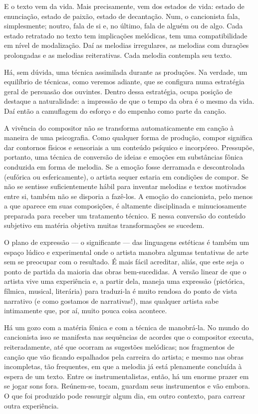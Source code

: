 E o texto vem da vida. Mais precisamente, vem dos estados de vida:
estado de enunciação, estado de paixão, estado de decantação. Num, o
cancionista fala, simplesmente; noutro, fala de si e, no último, fala de
alguém ou de algo. Cada estado retratado no texto tem implicações
melódicas, tem uma compatibilidade em nível de modalização. Daí as
melodias irregulares, as melodias com durações prolongadas e as melodias
reiterativas. Cada melodia contempla seu texto.

Há, sem dúvida, uma técnica assimilada durante as produções. Na verdade,
um equilíbrio de técnicas, como veremos adiante, que se configura numa
estratégia geral de persuasão dos ouvintes. Dentro dessa estratégia,
ocupa posição de destaque a naturalidade: a impressão de que o tempo da
obra é o mesmo da vida. Daí então a camuflagem do esforço e do empenho
como parte da canção.

A vivência do compositor não se transforma automaticamente em canção à
maneira de uma psicografia. Como qualquer forma de produção, compor
significa dar contornos físicos e sensoriais a um conteúdo psíquico e
incorpóreo. Pressupõe, portanto, uma técnica de conversão de ideias e
emoções em substâncias fônica conduzida em forma de melodia. Se a emoção
fosse derramada e descontrolada (eufórica ou esfericamente), o artista
sequer estaria em condições de compor. Se não se sentisse
suficientemente hábil para inventar melodias e textos motivados entre
si, também não se disporia a fazê-los. A emoção do cancionista, pelo
menos a que aparece em suas composições, é altamente disciplinada e
minuciosamente preparada para receber um tratamento técnico. E nessa
conversão do conteúdo subjetivo em matéria objetiva muitas
transformações se sucedem.

O plano de expressão --- o significante --- das linguagens estéticas é também
um espaço lúdico e experimental onde o artista manobra algumas
tentativas de arte sem se preocupar com o resultado. É mais fácil
acreditar, aliás, que este seja o ponto de partida da maioria das obras
bem-sucedidas. A versão linear de que o artista vive uma experiência e,
a partir dela, maneja uma expressão (pictórica, fílmica, musical,
literária) para traduzi-la é muito rendosa do ponto de vista narrativo
(e como gostamos de narrativas!), mas qualquer artista sabe intimamente
que, por aí, muito pouca coisa acontece.

Há um gozo com a matéria fônica e com a técnica de manobrá-la. No mundo
do cancionista isso se manifesta nas sequências de acordes que o
compositor executa, reiteradamente, até que ocorram as sugestões
melódicas; nos fragmentos de canção que vão ficando espalhados pela
carreira do artista; e mesmo nas obras incompletas, tão frequentes, em
que a melodia já está plenamente concluída à espera de um texto. Entre
os instrumentalistas, então, há um enorme prazer em se jogar sons fora.
Reúnem-se, tocam, guardam seus instrumentos e vão embora. O que foi
produzido pode ressurgir algum dia, em outro contexto, para carrear
outra experiência.

